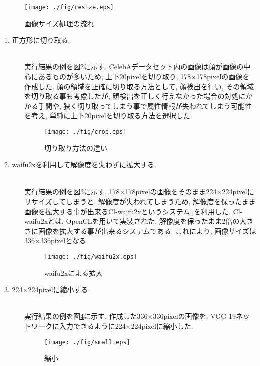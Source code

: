 \begin{figure}[H]
 \begin{center}
  \texttt{[image: ./fig/resize.eps]}
  \caption{画像サイズ処理の流れ}
  \label{fig:resize}
 \end{center}
\end{figure}


\begin{description}
\item[1. 正方形に切り取る.]\mbox{}\\ 
実行結果の例を図\ref{fig:crop}に示す. CelebAデータセット内の画像は顔が画像の中心にあるものが多いため, 上下20pixelを切り取り, 178×178pixelの画像を作成した. 顔の領域を正確に切り取る方法として, 顔検出を行い, その領域を切り取る事も考慮したが, 顔検出を正しく行えなかった場合の対処にかかる手間や, 狭く切り取ってしまう事で属性情報が失われてしまう可能性を考え, 単純に上下20pixelを切り取る方法を選択した. 

\begin{figure}[H]
 \begin{center}
  \texttt{[image: ./fig/crop.eps]}
  \caption{切り取り方法の違い}
  \label{fig:crop}
 \end{center}
\end{figure}

\item[2. waifu2xを利用して解像度を失わずに拡大する.]\mbox{}\\ 
実行結果の例を図\ref{fig:waifu2x}に示す. 178×178pixelの画像をそのまま224×224pixelにリサイズしてしまうと, 解像度が失われてしまうため, 解像度を保ったまま画像を拡大する事が出来るCl-waifu2xというシステム[]を利用した. Cl-waifu2xとは, OpenCLを用いて実装された, 解像度を保ったまま2倍の大きさに画像を拡大する事が出来るシステムである. これにより, 画像サイズは336×336pixelとなる. 
\begin{figure}[H]
 \begin{center}
  \texttt{[image: ./fig/waifu2x.eps]}
  \caption{waifu2xによる拡大}
  \label{fig:waifu2x}
 \end{center}
\end{figure}


\item[3. 224×224pixelに縮小する. ]\mbox{}\\  
実行結果の例を図\ref{fig:small}に示す. 作成した336×336pixelの画像を, VGG-19ネットワークに入力できるように224×224pixelに縮小した. 
\begin{figure}[H]
 \begin{center}
  \texttt{[image: ./fig/small.eps]}
  \caption{縮小}
  \label{fig:small}
 \end{center}
\end{figure}
\end{description}

